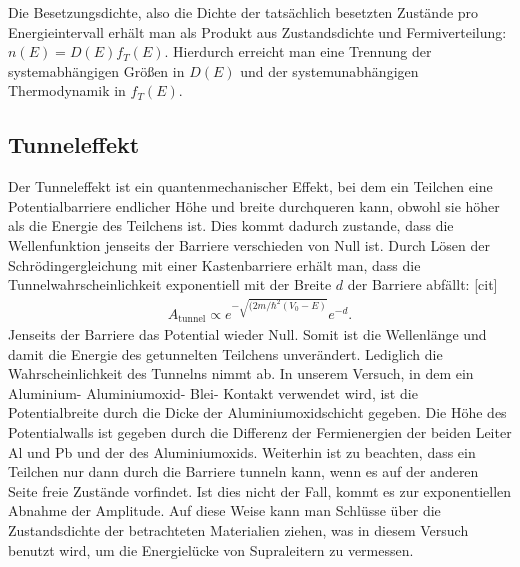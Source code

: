 \documentclass[twoside,        %
               BCOR12mm,       %
               english,ngerman, %
               fleqn,headsepline=false,footsepline=false
              ]{Vorlage/MFPREPORT}
\begin{document}
Die Besetzungsdichte, also die Dichte der tatsächlich besetzten Zustände pro
Energieintervall erhält man als
Produkt aus Zustandsdichte und Fermiverteilung: $n(E)=D(E)f_T(E)$. Hierdurch
erreicht man eine Trennung der systemabhängigen Größen in $D(E)$ und der
systemunabhängigen Thermodynamik in $f_T(E)$.

\subsection{Tunneleffekt}
Der Tunneleffekt ist ein quantenmechanischer Effekt, bei dem ein Teilchen eine
Potentialbarriere endlicher Höhe und breite durchqueren kann, obwohl sie höher
als die Energie des Teilchens ist. Dies kommt dadurch zustande, dass die
Wellenfunktion jenseits der Barriere verschieden von Null ist. 
Durch Lösen der Schrödingergleichung mit einer Kastenbarriere erhält man,
dass die Tunnelwahrscheinlichkeit exponentiell mit der Breite $d$ der Barriere
abfällt: [cit]
\begin{align}
    \label{eq:tunnelamp}
    A_\text{tunnel}\propto e^{-\sqrt{(2m/\hbar^2 (V_0-E)}}e^{-d}.
\end{align}
Jenseits der Barriere das Potential wieder Null. Somit ist die Wellenlänge und damit die Energie des getunnelten
Teilchens unverändert. Lediglich die Wahrscheinlichkeit des Tunnelns nimmt ab.
In unserem Versuch, in dem ein Aluminium- Aluminiumoxid- Blei- Kontakt
verwendet wird, ist die Potentialbreite durch die Dicke der
Aluminiumoxidschicht gegeben. Die Höhe des Potentialwalls ist gegeben durch die
Differenz der Fermienergien der beiden Leiter Al und Pb und der des
Aluminiumoxids.
Weiterhin ist zu beachten, dass ein Teilchen nur dann durch die Barriere
tunneln kann, wenn es auf der anderen Seite freie Zustände vorfindet. Ist dies
nicht der Fall, kommt es zur exponentiellen Abnahme der Amplitude. Auf diese
Weise kann man Schlüsse über die Zustandsdichte der betrachteten Materialien
ziehen, was in diesem Versuch benutzt wird, um die Energielücke von
Supraleitern zu vermessen.
\end{document}
